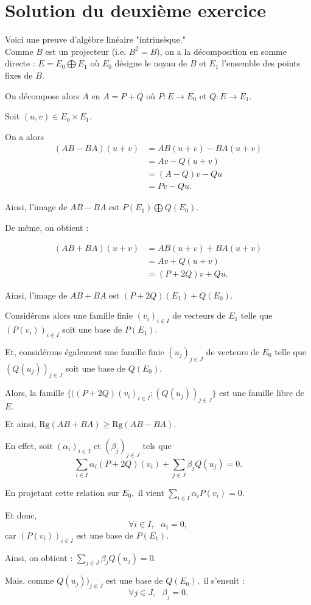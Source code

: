 \section{Solution du deuxième exercice}

Voici une preuve d'algèbre linéaire "intrinsèque."\\

Comme $B$ est un projecteur (i.e. $B^{2}=B$), on a la décomposition en somme directe : $\displaystyle E=E_{0}\bigoplus E_{1}$ où $E_{0}$ désigne le noyau de $B$ et $E_{1}$ l'ensemble des points fixes de $B.$

On décompose alors $A$ en $A=P+Q$ où $P : E\rightarrow E_{0}$ et $Q : E\rightarrow E_{1}.$

Soit $(u,v)\in E_{0}\times E_{1}.$

On a alors 
\begin{align*}
(AB-BA)(u+v) & = AB(u+v)-BA(u+v)\\
& = Av-Q(u+v)\\
& = (A-Q)v-Qu\\
& =Pv-Qu.
\end{align*}

Ainsi, l'image de $AB-BA$ est $\displaystyle P(E_{1})\bigoplus Q(E_{0}).$

De même, on obtient : 

\begin{align*}
(AB+BA)(u+v) & = AB(u+v)+BA(u+v)\\
& = Av+Q(u+v)\\
& = (P+2Q)v+Qu.
\end{align*}

Ainsi, l'image de $AB+BA$ est $\displaystyle (P+2Q)(E_{1})+Q(E_{0}).$

Considérons alors une famille finie $(v_{i})_{i\in I}$ de vecteurs de $E_{1}$ telle que $(P(v_{i}))_{i\in I}$ soit une base de $P(E_{1}).$

Et, considérons également une famille finie $(u_{j})_{j\in J}$ de vecteurs de $E_{0}$ telle que $(Q(u_{j}))_{j\in J}$ soit une base de $Q(E_{0}).$

Alors, la famille $\{((P+2Q)(v_{i})_{i\in I};(Q(u_{j}))_{j\in J}\}$ est une famille libre de $E.$

Et ainsi, $\boxed{\displaystyle \mbox{Rg}(AB+BA)\geq \mbox{Rg}(AB-BA).}$

En effet, soit $(\alpha_{i})_{i\in I}$ et $(\beta_{j})_{j\in J}$ tels que $$\sum_{i\in I}\alpha_{i}(P+2Q)(v_{i})+\sum_{j\in J}\beta_{j}Q(u_{j})=0.$$

En projetant cette relation sur $E_{0},$ il vient $\displaystyle \sum_{i\in I}\alpha_{i}P(v_{i})=0.$ 

Et donc, $$\forall i\in I,\mbox{ } \alpha_{i}=0,$$ car $(P(v_{i}))_{i\in I}$ est une base de $P(E_{1}).$

Ainsi, on obtient : $\displaystyle \sum_{j\in J}\beta_{j}Q(u_{j})=0.$

Mais, comme $Q(u_{j}))_{j\in J}$ est une base de $Q(E_{0}),$ il s'ensuit : $$\forall j\in J,\mbox{ } \beta_{j}=0.$$  





